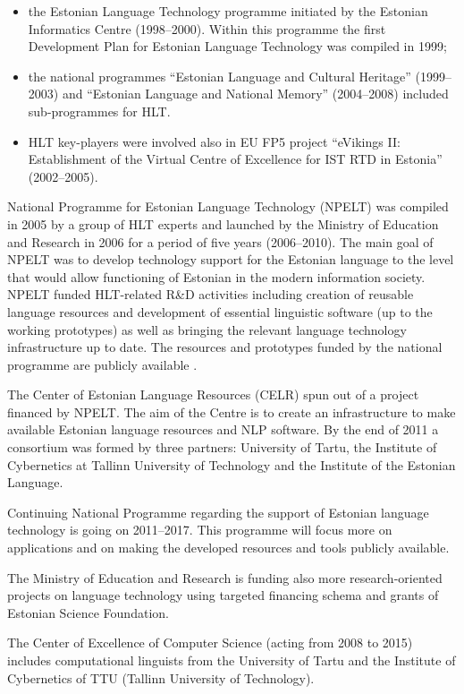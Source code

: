 \begin{multicols}{2}
\begin{itemize}
\item the Estonian Language Technology programme initiated by the Estonian Informatics Centre (1998--2000). Within this programme the first Development Plan for Estonian Language Technology was compiled in 1999;
\item the national programmes ``Estonian Language and Cultural Heritage'' (1999--2003) and ``Estonian  Language and National Memory'' (2004--2008) included sub-programmes for HLT. 
\item HLT key-players were involved also in EU FP5 project ``eVikings II: Establishment of the Virtual Centre of Excellence for IST RTD in Estonia'' (2002--2005).  
\end{itemize}

National Programme for Estonian Language Technology (NPELT) was compiled in 2005 by a group of HLT experts and launched by the Ministry of Education and Research in 2006 for a period of five years (2006--2010).  The main goal of NPELT was to develop technology support for the Estonian language to the level that would allow functioning of Estonian in the modern information society.  NPELT funded HLT-related R\&D activities including creation of reusable language resources and development of essential linguistic software (up to the working prototypes) as well as bringing the relevant language technology infrastructure up to date.  The resources and prototypes funded by the national programme are publicly available \cite{ekktt}.

The Center of Estonian Language Resources (CELR) spun out of a project financed by NPELT. The aim of the Centre is to create an infrastructure to make available Estonian language resources and NLP software. By the end of 2011 a consortium was formed by three partners: University of Tartu, the Institute of Cybernetics at Tallinn University of Technology and the Institute of the Estonian Language.

Continuing National Programme \cite{ekktt2} regarding the support of Estonian language technology is going on 2011--2017.  This programme will focus more on applications and on making the developed resources and tools publicly available.

The Ministry of Education and Research is funding also more research-oriented projects on language technology using targeted financing schema and grants of Estonian Science Foundation.

The Center of Excellence of Computer Science (acting from 2008 to 2015) includes computational linguists from the University of Tartu and the Institute of Cybernetics of TTU (Tallinn University of Technology). 


\end{multicols}
